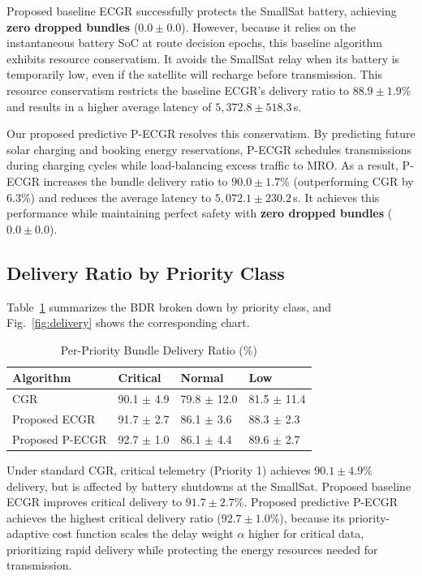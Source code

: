 \documentclass[a4paper,fleqn]{cas-dc}
\newcommand{\ecgr}{\textsf{ECGR}}
\newcommand{\cgr}{\textsf{CGR}}
\newcommand{\pecgr}{\textsf{P-ECGR}}
\begin{document}
Proposed baseline \ecgr{} successfully protects the SmallSat battery, achieving \textbf{zero dropped bundles} ($0.0 \pm 0.0$). However, because it relies on the instantaneous battery SoC at route decision epochs, this baseline algorithm exhibits resource conservatism. It avoids the SmallSat relay when its battery is temporarily low, even if the satellite will recharge before transmission. This resource conservatism restricts the baseline \ecgr{}'s delivery ratio to $88.9 \pm 1.9\%$ and results in a higher average latency of $5{,}372.8 \pm 518.3\,$s.

Our proposed predictive \pecgr{} resolves this conservatism. By predicting future solar charging and booking energy reservations, \pecgr{} schedules transmissions during charging cycles while load-balancing excess traffic to MRO. As a result, \pecgr{} increases the bundle delivery ratio to $90.0 \pm 1.7\%$ (outperforming CGR by $6.3\%$) and reduces the average latency to $5{,}072.1 \pm 230.2\,$s. It achieves this performance while maintaining perfect safety with \textbf{zero dropped bundles} ($0.0 \pm 0.0$).

\subsection{Delivery Ratio by Priority Class}
Table~\ref{tab:priority} summarizes the BDR broken down by priority class, and Fig.~\ref{fig:delivery} shows the corresponding chart.

\begin{table}[t]
\centering
\caption{Per-Priority Bundle Delivery Ratio (\%)}
\label{tab:priority}
\begin{tabular*}{\textwidth}{@{\extracolsep{\fill}}llll}
\hline
\textbf{Algorithm} & \textbf{Critical} & \textbf{Normal} & \textbf{Low} \\
\hline
CGR & 90.1 $\pm$ 4.9 & 79.8 $\pm$ 12.0 & 81.5 $\pm$ 11.4 \\
Proposed ECGR & 91.7 $\pm$ 2.7 & 86.1 $\pm$ 3.6 & 88.3 $\pm$ 2.3 \\
Proposed P-ECGR & 92.7 $\pm$ 1.0 & 86.1 $\pm$ 4.4 & 89.6 $\pm$ 2.7 \\
\hline
\end{tabular*}
\end{table}

Under standard \cgr{}, critical telemetry (Priority 1) achieves $90.1 \pm 4.9\%$ delivery, but is affected by battery shutdowns at the SmallSat. Proposed baseline \ecgr{} improves critical delivery to $91.7 \pm 2.7\%$. Proposed predictive \pecgr{} achieves the highest critical delivery ratio ($92.7 \pm 1.0\%$), because its priority-adaptive cost function scales the delay weight $\alpha$ higher for critical data, prioritizing rapid delivery while protecting the energy resources needed for transmission.
\end{document}
